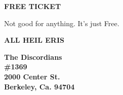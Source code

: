 \documentclass[11pt,a4paper]{memoir}
\begin{document}
\noindent

\begin{minipage}[c]{0.9\linewidth}
	\begin{center}
		\Huge{\textbf{FREE TICKET}}
	\end{center}
\end{minipage}

\hspace{0.5mm}

\begin{minipage}[c]{0.9\textwidth}
	\begin{center}
		Not good for anything. It's just Free.
	\end{center}
\end{minipage}

\hspace{0.5mm}

\begin{minipage}[c]{0.9\textwidth}
	\begin{center}
		\textbf{ALL HEIL ERIS\!\!}
	\end{center}
\end{minipage}

\hspace{0.5mm}

\begin{minipage}[c]{0.9\textwidth}
	\begin{center}
	\textbf{
		\tiny{The Discordians\\
		\#1369\\
		2000 Center St.\\
		Berkeley, Ca. 94704
		}}
	\end{center}
\end{minipage}
\end{document}
